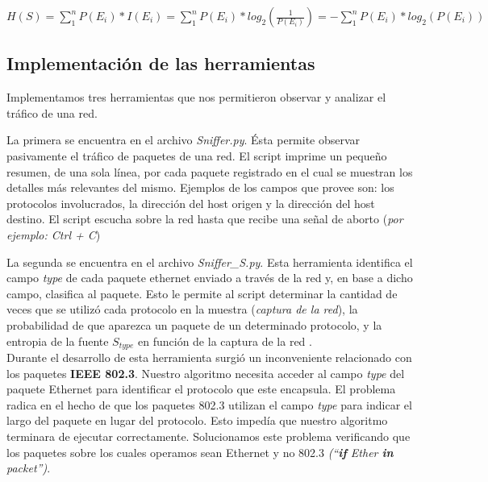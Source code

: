 \begin{center}
$H(S) = \sum_{1}^{n}P(E_i) * I(E_i) = \sum_{1}^{n}P(E_i) * log_2(\frac{1}{P(E_i)}) = - \sum_{1}^{n}P(E_i) * log_2(P(E_i))$
\end{center}


\subsection{Implementación de las herramientas}

Implementamos tres herramientas que nos permitieron observar y analizar el tráfico de una red.

La primera se encuentra en el archivo \textit{Sniffer.py}. Ésta permite observar pasivamente el tráfico de paquetes de una red. El script imprime un pequeño resumen, de una sola línea, por cada paquete registrado en el cual se muestran los detalles más relevantes del mismo. Ejemplos de los campos que provee son: los protocolos involucrados, la dirección del host origen y la dirección del host destino. El script escucha sobre la red hasta que recibe una señal de aborto (\textit{por ejemplo: Ctrl + C})

La segunda se encuentra en el archivo \textit{Sniffer\_S.py}. Esta herramienta identifica el campo \textit{type} de cada paquete ethernet enviado a través de la red y, en base a 
dicho campo, clasifica al paquete. Esto le permite al script determinar la cantidad de veces que se utilizó cada protocolo en la muestra (\textit{captura de la red}), la probabilidad 
de que aparezca un paquete de un determinado protocolo, y la entropia de la fuente $S_{type}$ en función de la captura de la red .\\
Durante el desarrollo de esta herramienta surgió un inconveniente relacionado con los paquetes \textbf{IEEE 802.3}. Nuestro algoritmo necesita acceder al campo \textit{type} del paquete Ethernet 
para identificar el protocolo que este encapsula. El problema radica en el hecho de que los paquetes 802.3 utilizan el campo \textit{type} para indicar el largo del paquete en lugar del protocolo. Esto impedía que nuestro algoritmo terminara de ejecutar correctamente. Solucionamos este problema verificando que los paquetes sobre los cuales operamos sean Ethernet y no 802.3 \textit{(``\textbf{if} Ether \textbf{in} packet'')}.

